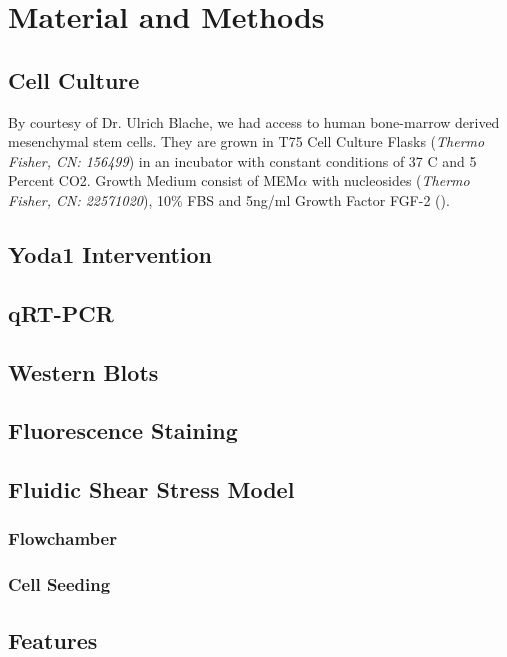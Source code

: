\renewcommand{\package}{\emph}
\newcommand{\product}{\textit}

\chapter{Material and Methods}

\section{Cell Culture}
By courtesy of Dr. Ulrich Blache, we had access to human bone-marrow derived mesenchymal stem cells. They are grown in T75 Cell Culture Flasks (\product{Thermo Fisher, CN: 156499}) in an incubator with constant conditions of 37 C and 5 Percent CO2. Growth Medium consist of MEM$\alpha$ with nucleosides (\product{Thermo Fisher, CN: 22571020}), 10\% FBS and 5ng/ml Growth Factor FGF-2 ().




\section{Yoda1 Intervention}


\section{qRT-PCR}

\section{Western Blots}

\section{Fluorescence Staining}

\section{Fluidic Shear Stress Model}

\subsection{Flowchamber}

\subsection{Cell Seeding}

\section{Features}

